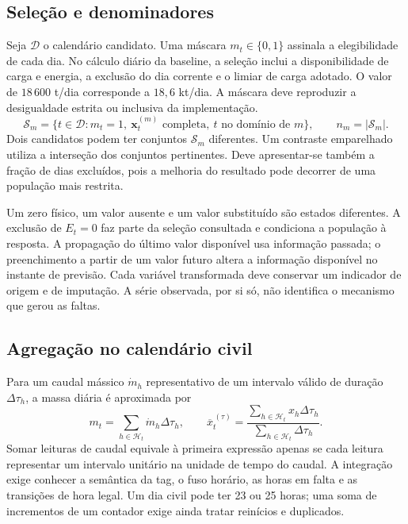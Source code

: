 \subsection{Seleção e denominadores}
\label{sec:mat-populacoes}
Seja $\mathcal D$ o calendário candidato. Uma máscara $m_t\in\{0,1\}$ assinala a elegibilidade de cada dia. No cálculo diário da baseline, a seleção inclui a disponibilidade de carga e energia, a exclusão do dia corrente e o limiar de carga adotado. O valor de $18\,600$ t/dia corresponde a $18{,}6$ kt/dia. A máscara deve reproduzir a desigualdade estrita ou inclusiva da implementação.
\begin{equation}
\mathcal S_m=\{t\in\mathcal D:m_t=1,\ \boldsymbol x_t^{(m)}\text{ completa},\ t\text{ no domínio de }m\},
\qquad n_m=|\mathcal S_m|.
\label{eq:mat-selecao}
\end{equation}
Dois candidatos podem ter conjuntos $\mathcal S_m$ diferentes. Um contraste emparelhado utiliza a interseção dos conjuntos pertinentes. Deve apresentar-se também a fração de dias excluídos, pois a melhoria do resultado pode decorrer de uma população mais restrita.

Um zero físico, um valor ausente e um valor substituído são estados diferentes. A exclusão de $E_t=0$ faz parte da seleção consultada e condiciona a população à resposta. A propagação do último valor disponível usa informação passada; o preenchimento a partir de um valor futuro altera a informação disponível no instante de previsão. Cada variável transformada deve conservar um indicador de origem e de imputação. A série observada, por si só, não identifica o mecanismo que gerou as faltas.


\subsection{Agregação no calendário civil}
\label{sec:mat-agregacao}
Para um caudal mássico $\dot m_h$ representativo de um intervalo válido de duração $\Delta\tau_h$, a massa diária é aproximada por
\begin{equation}
m_t=\sum_{h\in\mathcal H_t}\dot m_h\Delta\tau_h,
\qquad \overline x_t^{\,(\tau)}=
\frac{\sum_{h\in\mathcal H_t}x_h\Delta\tau_h}{\sum_{h\in\mathcal H_t}\Delta\tau_h}.
\label{eq:mat-integracao}
\end{equation}
Somar leituras de caudal equivale à primeira expressão apenas se cada leitura representar um intervalo unitário na unidade de tempo do caudal. A integração exige conhecer a semântica da tag, o fuso horário, as horas em falta e as transições de hora legal. Um dia civil pode ter 23 ou 25 horas; uma soma de incrementos de um contador exige ainda tratar reinícios e duplicados.

